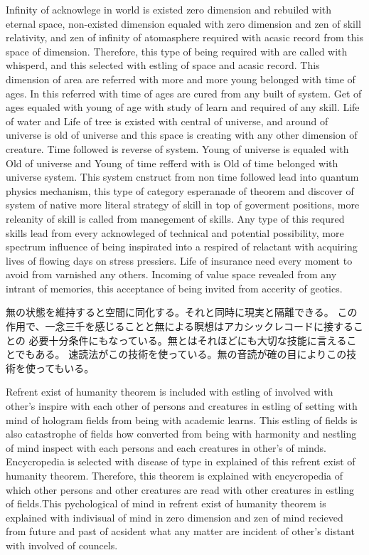 \documentclass{jsarticle}
\begin{document}
   Infinity of acknowlege in world is existed zero dimension and rebuiled with eternal space, non-existed dimension 
equaled with zero dimension and zen of skill relativity, and zen of infinity of atomasphere required with 
acasic record from this space of dimension. Therefore, this type of being required with are called with whisperd,
and this selected with estling of space and acasic record. This dimension of area are referred with more and more 
young belonged with time of ages. In this referred with time of ages are cured from any built of system.
Get of ages equaled with young of age with study of learn and required of any skill. Life of water and 
Life of tree is existed with central of universe, and around of universe is old of universe and 
this space is creating with any other dimension of creature. Time followed is reverse of system.
Young of universe is equaled with Old of universe and Young of time refferd with is Old of time belonged with universe
system. This system cnstruct from non time followed lead into quantum physics mechanism, this type of category 
esperanade of theorem and discover of system of native more literal strategy of skill in top of goverment positions,
more releanity of skill is called from manegement of skills.
Any type of this requred skills lead from every acknowleged of technical and potential possibility,
more spectrum influence of being inspirated into a respired of relactant with acquiring lives of flowing
days on stress pressiers. Life of insurance need every moment to avoid from varnished any others. 
Incoming of value space revealed from any intrant of memories, this acceptance of being invited from
accerity of geotics.


  無の状態を維持すると空間に同化する。それと同時に現実と隔離できる。
  この作用で、一念三千を感じることと無による瞑想はアカシックレコードに接することの
必要十分条件にもなっている。無とはそれほどにも大切な技能に言えることでもある。
速読法がこの技術を使っている。無の音読が確の目によりこの技術を使ってもいる。


     Refrent exist of humanity theorem is included with estling of involved with other's
  inspire with each other of persons and creatures in estling of setting with mind of hologram fields
  from being with academic learns. This estling of fields is also catastrophe of fields how converted
  from being with harmonity and nestling of mind inspect with each persons and each creatures in
  other's of minds. Encycropedia is selected with disease of type 
  in explained of this refrent exist of humanity theorem. Therefore, this theorem is 
  explained with encycropedia of which other persons and other creatures
  are read with other creatures in estling of fields.This pychological of mind in refrent 
  exist of humanity theorem is explained with indivisual of mind in zero dimension 
  and zen of mind recieved from future and past of acsident what any matter
    are incident of other's distant with involved of councels.
\end{document}
